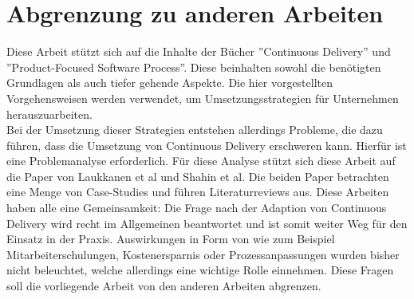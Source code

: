 \section{Abgrenzung zu anderen Arbeiten}
Diese Arbeit stützt sich auf die Inhalte der Bücher ''Continuous Delivery''\cite{Wolff.2016} und ''Product-Focused Software Process''\cite{Jedlitschka.2014}. Diese beinhalten sowohl die benötigten Grundlagen als auch tiefer gehende Aspekte. Die hier vorgestellten Vorgehensweisen werden verwendet, um Umsetzungsstrategien für Unternehmen herauszuarbeiten. \\ Bei der Umsetzung dieser Strategien entstehen allerdings Probleme, die dazu führen, dass die Umsetzung von Continuous Delivery erschweren kann. Hierfür ist eine Problemanalyse erforderlich. Für diese Analyse stützt sich diese Arbeit auf die Paper von Laukkanen et al\cite{Laukkanen.2017} und Shahin et al\cite{Shahin.2017}. Die beiden Paper betrachten eine Menge von Case-Studies und führen Literaturreviews aus. Diese Arbeiten haben alle eine Gemeinsamkeit: Die Frage nach der Adaption von Continuous Delivery wird recht im Allgemeinen beantwortet und ist somit weiter Weg für den Einsatz in der Praxis. Auswirkungen in Form von wie zum Beispiel Mitarbeiterschulungen, Kostenersparnis oder Prozessanpassungen wurden bisher nicht beleuchtet, welche allerdings eine wichtige Rolle einnehmen. Diese Fragen soll die vorliegende Arbeit von den anderen Arbeiten abgrenzen.  